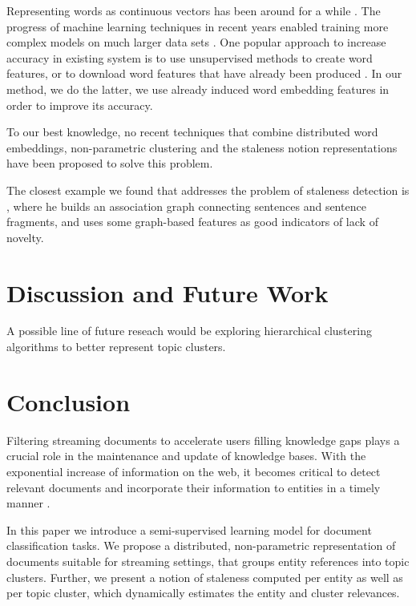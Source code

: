 \documentclass{article}
\begin{document}
Representing words as continuous vectors has been around for a while \cite{Hinton87, Elman90findingstructure}. The progress of machine learning techniques in recent years enabled training more complex models on much larger data sets \cite{mikolovChen}. One popular approach to increase accuracy in existing system is to use unsupervised methods to create word features, or to download word features that have already been produced \cite{Turian10wordrepresentations}. In our method, we do the latter, we use already induced word embedding features in order to improve its accuracy.

To our best knowledge, no recent techniques that combine distributed word embeddings, non-parametric clustering and the staleness notion representations have been proposed to solve this problem.

The closest example we found that addresses the problem of staleness detection is \cite{gamon}, where he builds an association graph connecting sentences and sentence fragments, and uses some graph-based features as good indicators of lack of novelty.

\section{Discussion and Future Work}
\label{related}

A possible line of future reseach would be exploring hierarchical clustering algorithms to better represent topic clusters.

\section{Conclusion}
\label{conclusion}

Filtering streaming documents to accelerate users filling knowledge gaps plays a crucial role in the maintenance and update of knowledge bases.
With the exponential increase of information on the web, it becomes critical to detect relevant documents and incorporate their information to entities in a timely manner \cite{jingang13}.

In this paper we introduce a semi-supervised learning model for document classification tasks. We propose a distributed, non-parametric representation of documents suitable for streaming settings, that groups entity references into topic clusters. Further, we present a notion of staleness computed per entity as well as per topic cluster, which dynamically estimates the entity and cluster relevances.
\end{document}
